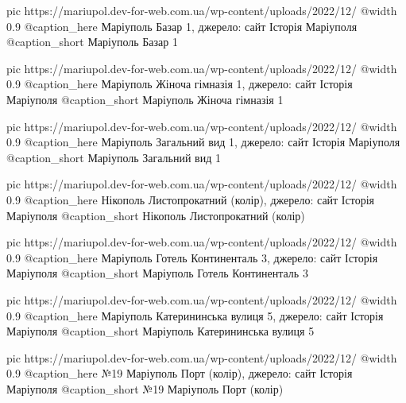   pic https://mariupol.dev-for-web.com.ua/wp-content/uploads/2022/12/%
  @width 0.9
  @caption_here Маріуполь Базар 1, джерело: сайт Історія Маріуполя
  @caption_short Маріуполь Базар 1

  pic https://mariupol.dev-for-web.com.ua/wp-content/uploads/2022/12/%
  @width 0.9
  @caption_here Маріуполь Жіноча гімназія 1, джерело: сайт Історія Маріуполя
  @caption_short Маріуполь Жіноча гімназія 1

  pic https://mariupol.dev-for-web.com.ua/wp-content/uploads/2022/12/%
  @width 0.9
  @caption_here Маріуполь Загальний вид 1, джерело: сайт Історія Маріуполя
  @caption_short Маріуполь Загальний вид 1

  pic https://mariupol.dev-for-web.com.ua/wp-content/uploads/2022/12/%
  @width 0.9
  @caption_here Нікополь Листопрокатний (колір), джерело: сайт Історія Маріуполя
  @caption_short Нікополь Листопрокатний (колір)

  pic https://mariupol.dev-for-web.com.ua/wp-content/uploads/2022/12/%
  @width 0.9
  @caption_here Маріуполь Готель Континенталь 3, джерело: сайт Історія Маріуполя
  @caption_short Маріуполь Готель Континенталь 3

  pic https://mariupol.dev-for-web.com.ua/wp-content/uploads/2022/12/%
  @width 0.9
  @caption_here Маріуполь Катерининська вулиця 5, джерело: сайт Історія Маріуполя
  @caption_short Маріуполь Катерининська вулиця 5

  pic https://mariupol.dev-for-web.com.ua/wp-content/uploads/2022/12/%
  @width 0.9
  @caption_here №19 Маріуполь Порт (колір), джерело: сайт Історія Маріуполя
  @caption_short №19 Маріуполь Порт (колір)

